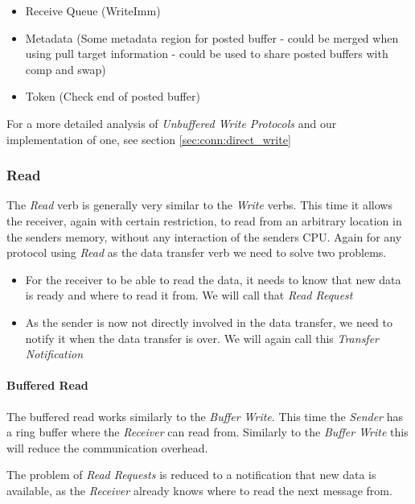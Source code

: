 \begin{itemize}
  \item Receive Queue (WriteImm)
  \item Metadata (Some metadata region for posted buffer - could be merged when using pull target information - could be used to share posted buffers with comp and swap)
  \item Token (Check end of posted buffer)
\end{itemize}


For a more detailed analysis of \emph{Unbuffered Write Protocols} and our implementation of one, see section \ref{sec:conn:direct_write}


\subsubsection{Read}
The \emph{Read} verb is generally very similar to the \emph{Write} verbs. This time it allows the receiver, again with certain
restriction, to read from an arbitrary location in the senders memory, without any interaction of the senders CPU. Again for
any protocol using \emph{Read} as the data transfer verb we need to solve two problems.

\begin{itemize}
  \item For the receiver to be able to read the data, it needs to know that new data is ready and where to read it from.
    We will call that \emph{Read Request}

  \item As the sender is now not directly involved in the data transfer, we need to notify it when the data transfer is 
over. We will again call this  \emph{Transfer Notification}
\end{itemize}

\paragraph{Buffered Read}


The buffered read works similarly to the \emph{Buffer Write}. This time the \emph{Sender} has a ring buffer where the 
\emph{Receiver} can read from. Similarly to the \emph{Buffer Write} this will reduce the communication overhead.

The problem of \emph{Read Requests} is reduced to a notification that new data is available, as the \emph{Receiver} already
knows where to read the next message from.

